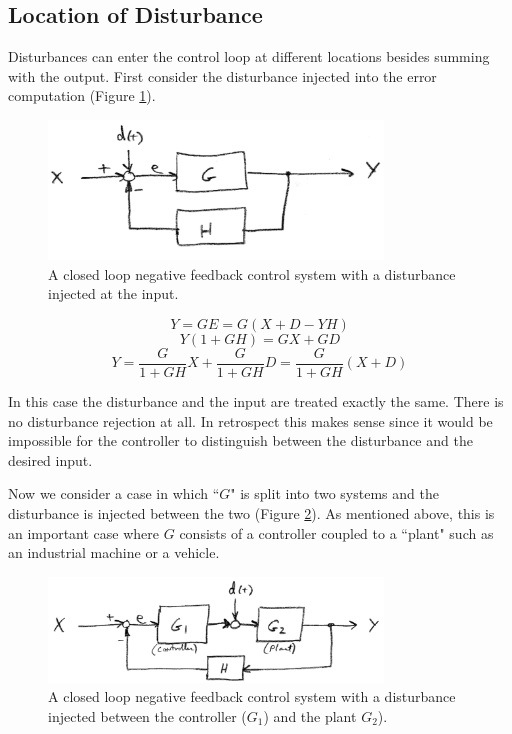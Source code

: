 \subsection{Location of Disturbance}

Disturbances can enter the control loop at different locations besides summing with the output.  First consider the disturbance injected into the error computation (Figure \ref{disturbanceaterror}).


\begin{figure}\centering
\includegraphics[width=3.5in]{figs06/00776a.png}
\caption{A closed loop negative feedback control system with a disturbance injected at the input.}\label{disturbanceaterror}
\end{figure}

\[
Y = GE = G(X+D-YH)
\]
\[
Y(1+GH) = GX + GD
\]
\[
Y = \frac{G}{1+GH}X  + \frac{G}{1+GH}D = \frac{G}{1+GH}(X+D)
\]

In this case the disturbance and the input are treated exactly the same. There is no disturbance rejection at all.  In retrospect this makes sense since it would be impossible for the controller to distinguish between the disturbance and the desired input.

Now we consider a case in which ``$G$" is split into two systems and the disturbance is injected between the two (Figure \ref{disturbancebetweenCP}).  As mentioned above,  this is an important case where $G$ consists of a controller coupled to a ``plant" such as an industrial machine or a vehicle.


\begin{figure}\centering
\includegraphics[width=3.5in]{figs06/00777a.png}
\caption{A closed loop negative feedback control system with a disturbance injected between the controller ($G_1$) and the plant $G_2$).}\label{disturbancebetweenCP}
\end{figure}


